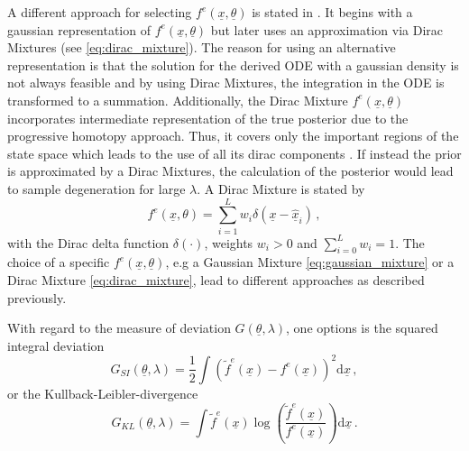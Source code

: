 \documentclass[a4paper]{IEEEtran}
\begin{document}
A different approach for selecting $f^e(\underline{x}, \underline{\theta})$ is stated in \cite{hanebeck2012a}. It begins with a gaussian representation of $f^e(\underline{x}, \underline{\theta})$ but later uses an approximation via Dirac Mixtures (see \eqref{eq:dirac_mixture}).
The reason for using an alternative representation is that the solution for the derived ODE with a gaussian density is not always feasible and by using Dirac Mixtures, the integration in the ODE is transformed to a summation. Additionally, the Dirac Mixture $f^e(\underline{x}, \underline{\theta})$ 
incorporates intermediate representation of the true posterior due to the progressive homotopy approach. 
Thus, it covers only the important regions of the state space which leads to the use of all its dirac components \cite{hanebeck2012a}. If instead the prior is approximated by a Dirac Mixtures, the calculation of the posterior would lead to sample degeneration for large $\lambda$.
A Dirac Mixture is stated by
\begin{equation}
    f^{e}(\underline{x}, \theta) = \sum^{L}_{i=1} w_{i} \delta(\underline{x}-\hat{\underline{x}}_{i}) \,,
    \label{eq:dirac_mixture}
\end{equation}
with the Dirac delta function $\delta( \cdot )$, weights $w_{i} > 0$ and $\sum^{L}_{i=0} w_{i} = 1$. The choice of a specific $f^e(\underline{x}, \underline{\theta})$, e.g a Gaussian Mixture \eqref{eq:gaussian_mixture} or a Dirac Mixture \eqref{eq:dirac_mixture}, lead to different approaches as described previously.

With regard to the measure of deviation $G(\underline{\theta},\lambda)$, one options is the squared integral deviation
\begin{equation}
    G_{SI}(\underline{\theta}, \lambda) = \frac{1}{2} \int (\tilde{f}^e(\underline{x})-f^{e}(\underline{x}))^2 \mathrm{d}\underline{x}\,,
    \label{eq:squared_integral_dev}
\end{equation}
or the Kullback-Leibler-divergence
\begin{equation}
    G_{KL}(\underline{\theta}, \lambda) = \int \tilde{f}^e(\underline{x}) \log\left(\frac{\tilde{f}^e(\underline{x})}{f^{e}(\underline{x})} \right) \mathrm{d}\underline{x} \,.
    \label{eq:kb_div}
\end{equation}
\end{document}
